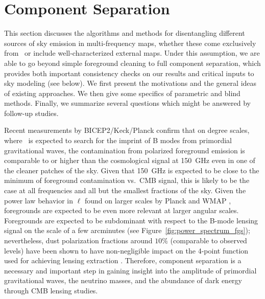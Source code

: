           
\section{Component Separation}
\label{sec:compsep}


This section discusses the algorithms and methods for disentangling different sources of sky emission in multi-frequency maps, whether these come exclusively from \cmbexp\ or include well-characterized external maps. Under this assumption, we are able to go beyond simple foreground cleaning to full component separation, which provides both important consistency checks on our results and critical inputs to sky modeling (see below). We first present the motivations and the general ideas of existing approaches. We then give some specifics of parametric and blind methods. Finally, we summarize several questions which might be answered by follow-up studies.

Recent measurements by BICEP2/Keck/Planck \cite{Ade:2015tva} confirm that on degree scales, where 
\cmbexp\ is expected to search for 
the imprint of B modes from primordial gravitational waves, the contamination from polarized foreground emission is  comparable to or higher than the cosmological signal at 150~GHz even in one of the cleaner patches of the sky.
Given that 150~GHz is expected to be close to the minimum of foreground contamination vs.~CMB signal, this 
is likely to be the case at all frequencies and all but the smallest fractions of the sky.
Given the power law behavior in $\ell$ found on larger scales by Planck and WMAP \cite{Adam:2015tpy,Page:2006hz}, foregrounds are expected to be even more relevant at larger angular scales. Foregrounds are expected to be subdominant  with respect to the B-mode lensing signal on the scale of a few arcminutes (see Figure~\ref{fig:power_spectrum_fgs}); nevertheless, dust polarization fractions around $10\%$ (comparable to observed levels) have been shown to have non-negligible impact on the 4-point function used for achieving lensing extraction \cite{Fantaye:2012ha}. Therefore, component separation is a necessary and important step in gaining insight into the amplitude of primordial gravitational waves, the neutrino masses, and the abundance of dark energy through CMB lensing studies.

